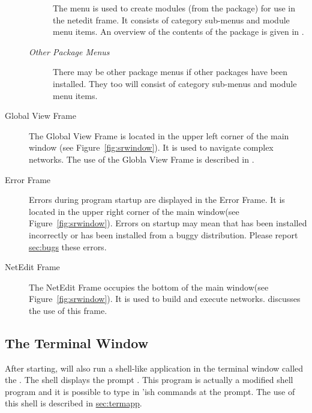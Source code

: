 \begin{description}
  \begin{description}
  \item[] The  menu is used to create modules
    (from the \biopse package) for use in the netedit frame.  It consists
    of category sub-menus and module menu items.   An overview of the
    contents of the \biopse{} package is given in .
  \end{description}

  \begin{description}
  \item [\textit{Other Package Menus}] There may be other package
    menus if other packages have been installed.  They too will consist
    of category sub-menus and module menu items.
  \end{description}
  
\item[Global View Frame] The Global View Frame is located in the upper left
  corner of the main window (see Figure~\ref{fig:srwindow}). It is used to
  navigate complex networks.  The use of the Globla View Frame is
  described in .
  
\item[Error Frame] Errors during program startup are displayed in the Error
  Frame.  It is located in the upper right corner of the main window(see
  Figure~\ref{fig:srwindow}).  Errors on startup may mean that \sr{} has
  been installed incorrectly or has been installed from a buggy
  distribution.  Please report \hyperref{report}{(see
  Section~}{)}{sec:bugs} these 
  errors.
  
\item[NetEdit Frame] The NetEdit Frame occupies the bottom of the main
  window(see Figure~\ref{fig:srwindow}).  It is used to build and execute
  networks.   discusses the use
  of this frame.

\end{description}

\subsection{The Terminal Window}
\label{sec:termwinapp}

After starting, \sr{} will also run a shell-like application in the
terminal window called the .  The \sr{} shell displays the
prompt .  This program is actually a modified  shell program and it is possible to type in
'ish \sr{} commands at the prompt. The use of this shell
is described in \hyperref{a later section}{Section~}{}{sec:termapp}.



